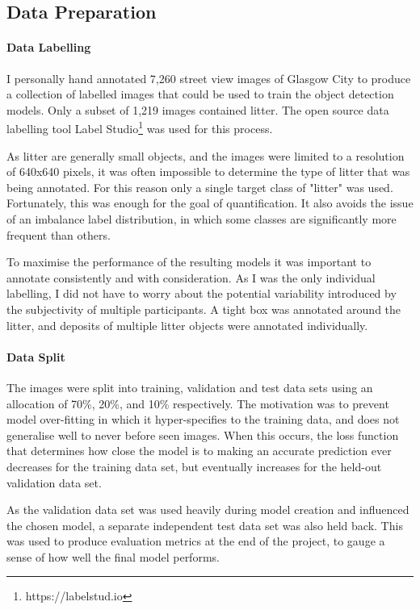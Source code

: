 \documentclass{thesis}
\begin{document}
\subsection{Data Preparation}

\paragraph{Data Labelling}

I personally hand annotated 7,260 street view images of Glasgow City to produce a collection of labelled images that could be used to train the object detection models. Only a subset of 1,219 images contained litter. The open source data labelling tool Label Studio\footnote{https://labelstud.io} was used for this process.

As litter are generally small objects, and the images were limited to a resolution of 640x640 pixels, it was often impossible to determine the type of litter that was being annotated. For this reason only a single target class of "litter" was used. Fortunately, this was enough for the goal of quantification. It also avoids the issue of an imbalance label distribution, in which some classes are significantly more frequent than others.

To maximise the performance of the resulting models it was important to annotate consistently and with consideration. As I was the only individual labelling, I did not have to worry about the potential variability introduced by the subjectivity of multiple participants. A tight box was annotated around the litter, and deposits of multiple litter objects were annotated individually.

\paragraph{Data Split}

The images were split into training, validation and test data sets using an allocation of 70\%, 20\%, and 10\% respectively. The motivation was to prevent model over-fitting in which it hyper-specifies to the training data, and does not generalise well to never before seen images. When this occurs, the loss function that determines how close the model is to making an accurate prediction ever decreases for the training data set, but eventually increases for the held-out validation data set.

As the validation data set was used heavily during model creation and influenced the chosen model, a separate independent test data set was also held back. This was used to produce evaluation metrics at the end of the project, to gauge a sense of how well the final model performs.
\end{document}
